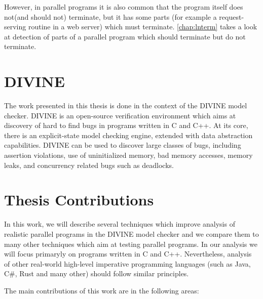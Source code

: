 However, in parallel programs it is also common that the program itself does
not(and should not) terminate, but it has some parts (for example a
request-serving routine in a web server) which must terminate.
\autoref{chap:lnterm} takes a look at detection of parts of a parallel program which should terminate but do not terminate.

\section{DIVINE}

The work presented in this thesis is done in the context of the DIVINE model checker.
DIVINE is an open-source verification environment which aims at discovery of hard to find bugs in programs written in C and C++.
At its core, there is an explicit-state model checking engine, extended with data abstraction capabilities.
DIVINE can be used to discover large classes of bugs, including assertion violations, use of uninitialized memory, bad memory accesses, memory leaks, and concurrency related bugs such as deadlocks.


\section{Thesis Contributions}

In this work, we will describe several techniques which improve analysis of realistic parallel programs in the DIVINE model checker and we compare them to many other techniques which aim at testing parallel programs.
In our analysis we will focus primaryly on programs written in C and C++.
Nevertheless, analysis of other real-world high-level imperative programming
languages (such as Java, C\#, Rust and many other) should follow similar
principles.

The main contributions of this work are in the following areas:

